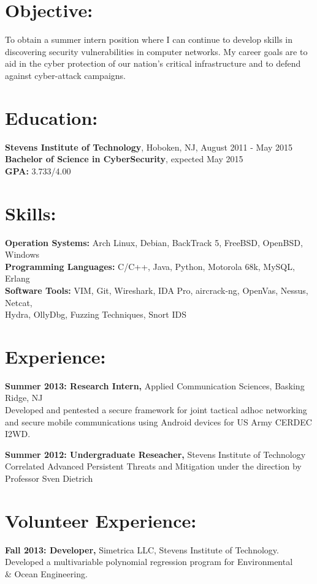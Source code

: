 \documentclass[margin]{res}
\begin{document}
\begin{resume} 
 
\section{Objective:} 
To obtain a summer intern position where I can continue to develop skills in \\ discovering security vulnerabilities in computer networks. My career goals are to aid in the cyber protection of our nation's critical infrastructure and to defend against cyber-attack campaigns.

\section{Education:}
{\bf Stevens Institute of Technology}, Hoboken, NJ, August 2011 - May 2015 \\
{\bf Bachelor of Science in CyberSecurity}, expected May 2015 \\ 
{\bf GPA:} 3.733/4.00

\section{Skills:}
{\bf Operation Systems:} Arch Linux, Debian, BackTrack 5, FreeBSD, OpenBSD, Windows \\
{\bf Programming Languages:} C/C++, Java, Python, Motorola 68k, MySQL, Erlang \\
{\bf Software Tools:} VIM, Git, Wireshark, IDA Pro, aircrack-ng, OpenVas, Nessus, Netcat, \\ 
Hydra, OllyDbg, Fuzzing Techniques, Snort IDS 

\section{Experience:}
{\bf Summer 2013: Research Intern,} Applied Communication Sciences, Basking Ridge, NJ \\
Developed and pentested a secure framework for joint tactical adhoc networking and  secure mobile communications using Android devices for US Army CERDEC I2WD.

{\bf Summer 2012: Undergraduate Reseacher,} Stevens Institute of Technology \\
Correlated Advanced Persistent Threats and Mitigation under the direction by Professor Sven Dietrich

\section{Volunteer Experience:} 
{\bf Fall 2013: Developer,} Simetrica LLC, Stevens Institute of Technology.\\       
Developed a multivariable polynomial regression program for Environmental \\ \& Ocean Engineering.
                

\end{resume}
\end{document}
